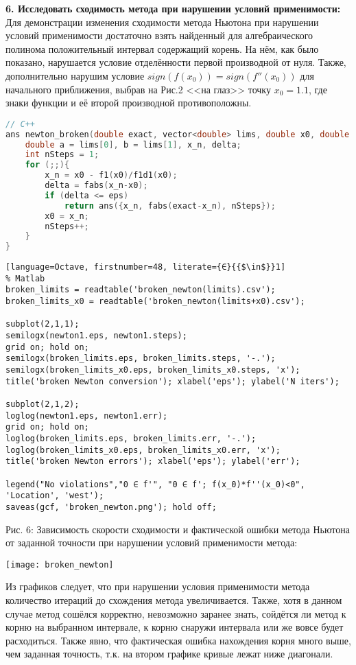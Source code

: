 {\Large{\textbf{6. Исследовать сходимость метода при нарушении условий применимости:}}}\\
Для демонстрации изменения сходимости метода Ньютона при нарушении условий применимости достаточно взять найденный  для алгебраического полинома положительный интервал содержащий корень. На нём, как было показано, нарушается условие отделённости первой производной от нуля. Также, дополнительно нарушим условие $sign(f(x_0))=sign(f''(x_0))$ для начального приближения, выбрав на Рис.2 <<на глаз>> точку $x_0=1.1$, где знаки функции и её второй производной противоположны.
\begin{lstlisting}[language=c++, firstnumber=38]
// C++
ans newton_broken(double exact, vector<double> lims, double x0, double eps){
    double a = lims[0], b = lims[1], x_n, delta;
    int nSteps = 1;
    for (;;){
        x_n = x0 - f1(x0)/f1d1(x0);
        delta = fabs(x_n-x0);
        if (delta <= eps)
            return ans({x_n, fabs(exact-x_n), nSteps});
        x0 = x_n;
        nSteps++;
    }
}
\end{lstlisting}
\begin{lstlisting}[language=Octave, firstnumber=48, literate={∈}{{$\in$}}1]
% Matlab
broken_limits = readtable('broken_newton(limits).csv');
broken_limits_x0 = readtable('broken_newton(limits+x0).csv');

subplot(2,1,1);
semilogx(newton1.eps, newton1.steps);
grid on; hold on;
semilogx(broken_limits.eps, broken_limits.steps, '-.');
semilogx(broken_limits_x0.eps, broken_limits_x0.steps, 'x');
title('broken Newton conversion'); xlabel('eps'); ylabel('N iters');

subplot(2,1,2);
loglog(newton1.eps, newton1.err);
grid on; hold on;
loglog(broken_limits.eps, broken_limits.err, '-.');
loglog(broken_limits_x0.eps, broken_limits_x0.err, 'x');
title('broken Newton errors'); xlabel('eps'); ylabel('err');

legend("No violations","0 ∈ f'", "0 ∈ f'; f(x_0)*f''(x_0)<0", 'Location', 'west');
saveas(gcf, 'broken_newton.png'); hold off;
\end{lstlisting}

\newpage

Рис. 6: Зависимость скорости сходимости и фактической ошибки метода Ньютона от заданной точности при нарушении условий применимости метода:
\begin{center}
    \texttt{[image: broken\_newton]}
\end{center}

Из графиков следует, что при нарушении условия применимости метода количество итераций до схождения метода увеличивается. Также, хотя в данном случае метод сошёлся корректно, невозможно заранее знать, сойдётся ли метод к корню на выбранном интервале, к корню снаружи интервала или же вовсе будет расходиться. Также явно, что фактическая ошибка нахождения корня много выше, чем заданная точность, т.к. на втором графике кривые лежат ниже диагонали.

